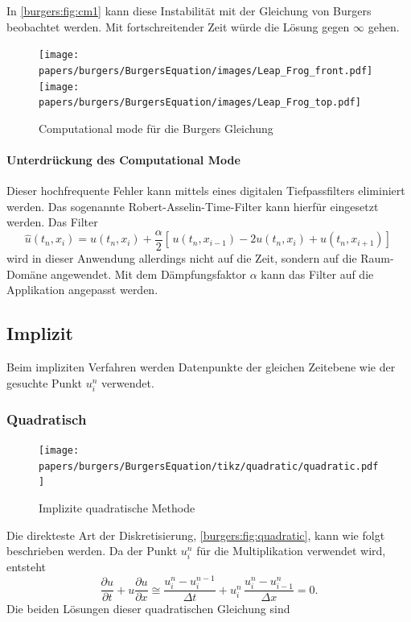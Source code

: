 	In \autoref{burgers:fig:cm1} kann diese Instabilit\"at mit der Gleichung von Burgers beobachtet werden.
	Mit fortschreitender Zeit w\"urde die L\"osung gegen $\infty$ gehen.


  \begin{figure}
	\centering
	\texttt{[image: papers/burgers/BurgersEquation/images/Leap\_Frog\_front.pdf]}
	\texttt{[image: papers/burgers/BurgersEquation/images/Leap\_Frog\_top.pdf]}
	\caption{Computational mode für die Burgers Gleichung}
	\label{burgers:fig:cm1}
	\end{figure}

	\paragraph{Unterdrückung des Computational Mode}
	\label{burgers:sec:cm}

	Dieser hochfrequente Fehler kann mittels eines digitalen Tiefpassfilters eliminiert werden.
	Das sogenannte Robert-Asselin-Time-Filter \cite{burgers:time_filter} kann hierf\"ur eingesetzt werden.
%
	Das Filter
		\begin{equation}
			\hat{u}(t_n,x_i) = u(t_n,x_i)+ \frac{\alpha}{2} [ \, u(t_n,x_{i-1}) - 2u(t_n,x_i)+u(t_n,x_{i+1}) ] \,
		\end{equation}
	wird in dieser Anwendung allerdings nicht auf die Zeit, sondern auf die Raum-Dom\"ane angewendet.
	Mit dem D\"ampfungsfaktor $\alpha$ kann das Filter auf die Applikation angepasst werden.

\subsection{Implizit}
%
	Beim impliziten Verfahren werden Datenpunkte der gleichen Zeitebene wie der gesuchte Punkt $u_{i}^{n}$ verwendet.


\subsubsection{Quadratisch}
     \begin{figure}
	\centering
	\texttt{[image: papers/burgers/BurgersEquation/tikz/quadratic/quadratic.pdf]}
	\caption{Implizite quadratische Methode}
	\label{burgers:fig:quadratic}
	\end{figure}

	Die direkteste Art der Diskretisierung, \autoref{burgers:fig:quadratic}, kann wie folgt beschrieben werden.
	Da der Punkt $u_{i}^{n}$ f\"ur die Multiplikation verwendet wird, entsteht
	\begin{equation}
	\frac {\partial u}{\partial t}+u{\frac {\partial u}{\partial x}} \cong \frac{u_{i}^{n}-u_{i}^{n-1}}{\Delta t}+ u_{i}^{n}\, \frac{u_{i}^{n}-u_{i-1}^{n}}{\Delta x}=0.
	\end{equation}
	Die beiden L\"osungen dieser quadratischen Gleichung sind

